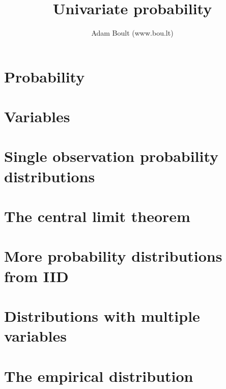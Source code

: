 \documentclass[oneside]{book}
\begin{document}
\author{Adam Boult (www.bou.lt)}
\title{Univariate probability}
\maketitle

\setcounter{tocdepth}{0}
\tableofcontents



\part{Probability}




\part{Variables}







\part{Single observation probability distributions}



\part{The central limit theorem}





\part{More probability distributions from IID}







\part{Distributions with multiple variables}



\part{The empirical distribution}

\end{document}
